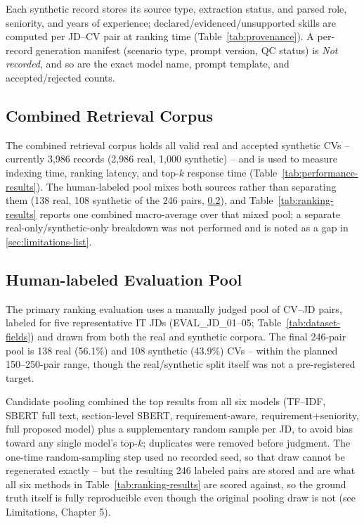 \documentclass[12pt,a4paper,oneside]{report}
\begin{document}
Each synthetic record stores its source type, extraction status, and parsed role, seniority, and years of experience; declared/evidenced/unsupported skills are computed per JD--CV pair at ranking time (Table~\ref{tab:provenance}). A per-record generation manifest (scenario type, prompt version, QC status) is \emph{Not recorded}, and so are the exact model name, prompt template, and accepted/rejected counts.

\subsection{Combined Retrieval Corpus}
The combined retrieval corpus holds all valid real and accepted synthetic CVs -- currently 3,986 records (2,986 real, 1,000 synthetic) -- and is used to measure indexing time, ranking latency, and top-$k$ response time (Table~\ref{tab:performance-results}). The human-labeled pool mixes both sources rather than separating them (138 real, 108 synthetic of the 246 pairs, \cref{sec:labeled-pool}), and Table~\ref{tab:ranking-results} reports one combined macro-average over that mixed pool; a separate real-only/synthetic-only breakdown was not performed and is noted as a gap in \cref{sec:limitations-list}.

\subsection{Human-labeled Evaluation Pool}
\label{sec:labeled-pool}
The primary ranking evaluation uses a manually judged pool of CV--JD pairs, labeled for five representative IT JDs (EVAL\_JD\_01--05; Table~\ref{tab:dataset-fields}) and drawn from both the real and synthetic corpora. The final 246-pair pool is 138 real (56.1\%) and 108 synthetic (43.9\%) CVs -- within the planned 150--250-pair range, though the real/synthetic split itself was not a pre-registered target.

Candidate pooling combined the top results from all six models (TF--IDF, SBERT full text, section-level SBERT, requirement-aware, requirement+seniority, full proposed model) plus a supplementary random sample per JD, to avoid bias toward any single model's top-$k$; duplicates were removed before judgment. The one-time random-sampling step used no recorded seed, so that draw cannot be regenerated exactly -- but the resulting 246 labeled pairs are stored and are what all six methods in Table~\ref{tab:ranking-results} are scored against, so the ground truth itself is fully reproducible even though the original pooling draw is not (see Limitations, Chapter 5).
\end{document}
